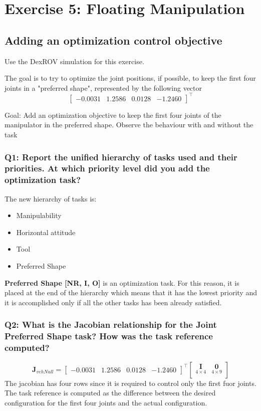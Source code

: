\documentclass{article}
\begin{document}
\section{Exercise 5: Floating Manipulation}
\subsection{Adding an optimization control objective}
Use the DexROV simulation for this exercise. 

The goal is to try to optimize the joint positions, if possible, to keep the first four joints in a "preferred shape", represented by the following vector
\begin{displaymath}
\begin{bmatrix}-0.0031 & 1.2586 & 0.0128 & -1.2460 \end{bmatrix}^\top
\end{displaymath}

Goal: Add an optimization objective to keep the first four joints of the manipulator in the preferred shape. Observe the behaviour with and without the task

\subsubsection{Q1: Report the unified hierarchy of tasks used and their priorities. At which priority level did you add the optimization task?}

The new hierarchy of tasks is:
\begin{itemize} 
	\item Manipulability
	\item Horizontal attitude
        \item Tool
        \item Preferred Shape 
\end{itemize}

\textbf{Preferred Shape [NR, I, O]} is an optimization task. For this reason, it is placed at the end of the hierarchy which means that it has the lowest priority and it is accomplished only if all the other tasks has been already satisfied. 

\subsubsection{Q2: What is the Jacobian relationship for the Joint Preferred Shape task? How was the task reference computed?}

\begin{equation}
\boldsymbol{J}_{vehNull}=
\begin{bmatrix}-0.0031 & 1.2586 & 0.0128 & -1.2460 \end{bmatrix}^\top
    \begin{bmatrix}
     \underset{4\times4}{\boldsymbol{I}} & \underset{4\times9}{\boldsymbol{0}} \\
    \end{bmatrix}
\end{equation}
The jacobian has four rows since it is required to control only the first fuor joints.
The task reference is computed as the difference between the desired configuration for the first four joints and the actual configuration. 
\end{document}
